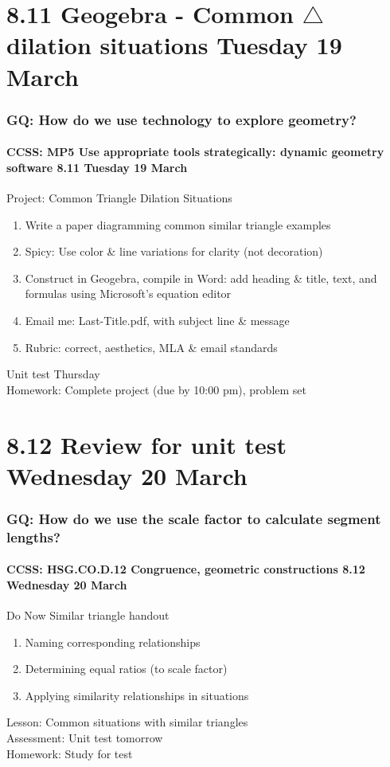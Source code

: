 \documentclass{beamer}
\begin{document}
\section{8.11 Geogebra - Common $\triangle$ dilation situations Tuesday 19 March}
  \frame
  {
    \frametitle{GQ: How do we use technology to explore geometry?}
    \framesubtitle{CCSS: MP5 Use appropriate tools strategically: dynamic geometry software \hfill \alert{8.11 Tuesday 19 March}}

    \begin{block}{Project: Common Triangle Dilation Situations}
      \begin{enumerate}
        \item Write a paper diagramming common similar triangle examples
        \item Spicy: Use color \& line variations for clarity (not decoration)
        \item Construct in Geogebra, compile in Word: add heading \& title, text, and formulas using Microsoft's equation editor
        \item Email me: Last-Title.pdf, with subject line \& message
        \item Rubric: correct, aesthetics, MLA \& email standards
      \end{enumerate}
    \end{block}
    \alert{Unit test Thursday}\\
    Homework: Complete project (due by 10:00 pm), problem set
  }

\section{8.12 Review for unit test Wednesday 20 March}
  \frame
  {
    \frametitle{GQ: How do we use the scale factor to calculate segment lengths?}
    \framesubtitle{CCSS: HSG.CO.D.12 Congruence, geometric constructions \hfill \alert{8.12 Wednesday 20 March}}

    \begin{block}{Do Now Similar triangle handout}
      \begin{enumerate}
        \item Naming corresponding relationships
        \item Determining equal ratios (to scale factor)
        \item Applying similarity relationships in situations
      \end{enumerate}
    \end{block}
    Lesson: Common situations with similar triangles\\
    Assessment: \alert{Unit test tomorrow}\\[0.5cm]
    Homework: Study for test
  }
\end{document}
